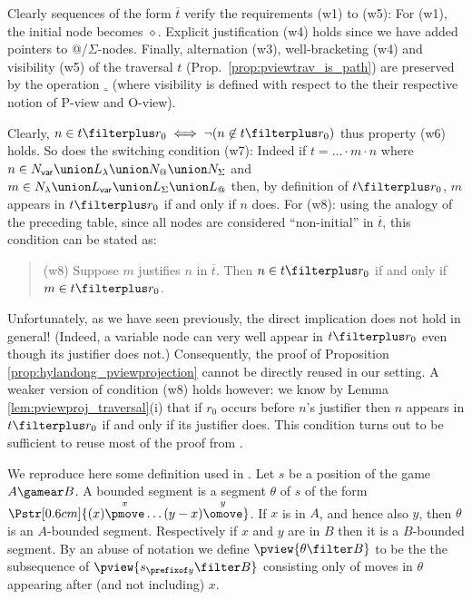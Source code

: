 Clearly sequences of the form $\overline{t}$ verify the requirements (w1) to (w5): For (w1), the initial node
becomes $\diamond$. Explicit justification (w4) holds since we have added pointers to @/$\Sigma$-nodes.
Finally, alternation (w3), well-bracketing (w4) and visibility (w5) of the traversal $t$ (Prop.\
\ref{prop:pviewtrav_is_path}) are preserved by the operation $\overline{\_}$
(where visibility is defined with respect to the their respective
notion of P-view and O-view).

Clearly, $n \in t\filterplus r_0 \iff \neg ( n \not\in t\filterplus
r_0)$ thus property (w6) holds. So does the switching condition
(w7): Indeed if $t = \ldots \cdot m \cdot n$ where $n\in N_{\sf
var} \union L_\lambda \union N_@ \union N_\Sigma$ and $m \in
N_\lambda \union L_{\sf var} \union L_\Sigma \union L_@$ then, by definition of $t\filterplus r_0$, $m$ appears in $t\filterplus r_0$ if and only if $n$ does. For (w8): using the analogy of the preceding table, since all nodes are considered ``non-initial'' in
$\overline{t}$, this condition can be stated as:
\begin{quote}
 (w8) Suppose $m$ justifies $n$ in $\overline{t}$. Then $n \in t\filterplus r_0$ if and only if $m\in t\filterplus r_0$.
\end{quote}
Unfortunately, as we have seen previously, the direct implication
does not hold in general! (Indeed, a variable node can very well
appear in $t\filterplus r_0$ even though its justifier does not.)
Consequently, the proof of Proposition
\ref{prop:hylandong_pviewprojection} cannot be directly reused in
our setting. A weaker version of condition (w8) holds however: we
know by Lemma \ref{lem:pviewproj_traversal}(i) that if $r_0$
occurs before $n$'s justifier then $n$ appears in $t\filterplus r_0$
if and only if its justifier does. This condition turns out to be
sufficient to reuse most of the proof from \cite{hylandong_pcf}.

We reproduce here some definition used in \cite{hylandong_pcf}. Let
$s$ be a position of the game $A\gamear B$. A bounded segment is
a segment $\theta$ of $s$ of the form
$\Pstr[0.6cm]{(x){\stackrel{x}\pmove} \ldots
(y-x){\stackrel{y}\omove}}$. If $x$ is in $A$, and hence also $y$,
then $\theta$ is an $A$-bounded segment. Respectively if $x$ and $y$
are in $B$ then it is a $B$-bounded segment. By an abuse of notation
we define $\pview{\theta \filter B}$ to be the the subsequence of
$\pview{s_{\prefixof y} \filter B}$ consisting only of moves in
$\theta$ appearing after (and not including) $x$.


